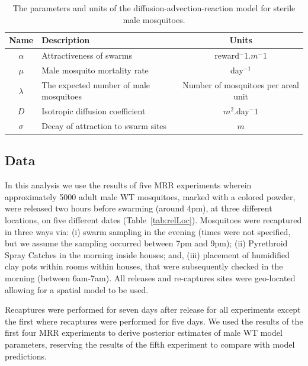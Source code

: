 \documentclass[]{bmcart}
\newcommand{\va}{{\alpha}}
\newcommand{\vb}{\bm{\beta}}
\newcommand{\vd}{{D}}
\newcommand{\vm}{{\mu}}
\begin{document}
\begin{table}[ht]
\centering
\begingroup

\begin{tabular}{cp{60mm}c}
\hline
Name & Description & Units \\
\hline
$\va$ & Attractiveness of swarms & reward$^-1$.$m^-1$\\
$\vm$ & Male mosquito mortality rate &  day$^{-1}$\\ 
$\lambda$ & The expected number of male mosquitoes & Number of mosquitoes per areal unit \\ 
$\vd$ & Isotropic diffusion coefficient & $m^2$.day$^-1$\\ 
$\sigma$ & Decay of attraction to swarm sites  & $m$\\
\hline
\end{tabular}
\endgroup
\caption{\label{tble:parameters} The parameters and units of the diffusion-advection-reaction model for sterile male mosquitoes.} 
\end{table}

\subsection{Data}
In this analysis we use the results of five MRR experiments \cite{Epopa2017} wherein approximately 5000 adult male WT mosquitoes, marked with a colored powder, were released two hours before swarming (around 4pm), at three different locations, on five different dates (Table~\ref{tab:relLoc}). Mosquitoes were recaptured in three ways via: (i) swarm sampling in the evening (times were not specified, but we assume the sampling occurred between 7pm and 9pm); (ii) Pyrethroid Spray Catches in the morning inside houses; and, (iii) placement of humidified clay pots within rooms within houses, that were subsequently checked in the morning (between 6am-7am). All releases and re-captures sites were geo-located allowing for a spatial model to be used.

Recaptures were performed for seven days after release for all experiments except the first where recaptures were performed for five days. We used the results of the first four MRR experiments to derive posterior estimates of male WT model parameters, reserving the results of the fifth experiment to compare with model predictions.
\end{document}
